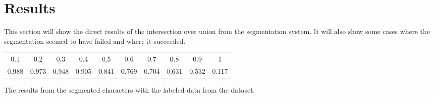 \newpage
\section{Results} %
\label{sec:results}

This section will show the direct results of the intersection over union from the segmentation system. It will also show some cases where the segmentation seemed to have failed and where it succeeded.


\begin{minipage}{\linewidth}
\flushleft
{} \label{tab:results:iou} 
\begin{tabular}{ c c c c c c c c c c}
\hline
\hline
0.1		&	0.2		&	0.3		&	0.4		&	0.5		&	0.6		&	0.7		&	0.8		&	0.9		&	1		\\
0.988	&	0.973	&	0.948	&	0.905	&	0.841	&	0.769	&	0.704	&	0.631	&	0.532	&	0.117	\\
\hline
\end{tabular}\par
\bigskip
The results from the segmented characters with the labeled data from the dataset.
\end{minipage}


